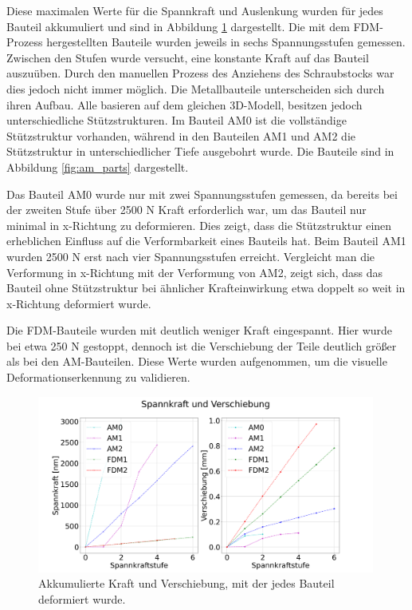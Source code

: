 Diese maximalen Werte für die Spannkraft und Auslenkung wurden für jedes Bauteil 
akkumuliert und sind in Abbildung \ref{fig:akkumulated} dargestellt. 
Die mit dem FDM-Prozess hergestellten Bauteile wurden jeweils in sechs Spannungsstufen
gemessen. Zwischen den Stufen wurde versucht, eine konstante Kraft auf das Bauteil 
auszuüben. Durch den manuellen Prozess des Anziehens des Schraubstocks war dies 
jedoch nicht immer möglich.
Die Metallbauteile unterscheiden sich durch ihren Aufbau. 
Alle basieren auf dem gleichen 3D-Modell, besitzen jedoch unterschiedliche 
Stützstrukturen. Im Bauteil AM0 ist die vollständige Stützstruktur vorhanden,
während in den Bauteilen AM1 und AM2 die Stützstruktur in unterschiedlicher 
Tiefe ausgebohrt wurde. Die Bauteile sind in Abbildung \ref{fig:am_parts} dargestellt.

Das Bauteil AM0 wurde nur mit zwei Spannungsstufen gemessen, 
da bereits bei der zweiten Stufe über 2500 N Kraft erforderlich war, 
um das Bauteil nur minimal in x-Richtung zu deformieren. Dies zeigt, 
dass die Stützstruktur einen erheblichen Einfluss auf die Verformbarkeit 
eines Bauteils hat. Beim Bauteil AM1 wurden 2500 N erst nach vier Spannungsstufen 
erreicht. Vergleicht man die Verformung in x-Richtung mit der Verformung von AM2,
 zeigt sich, dass das Bauteil ohne Stützstruktur bei ähnlicher Krafteinwirkung 
 etwa doppelt so weit in x-Richtung deformiert wurde.

 Die FDM-Bauteile wurden mit deutlich weniger Kraft eingespannt. 
 Hier wurde bei etwa 250 N gestoppt, dennoch ist die Verschiebung der 
 Teile deutlich größer als bei den AM-Bauteilen. Diese Werte wurden aufgenommen, 
 um die visuelle Deformationserkennung zu validieren.

\begin{figure}[H]
    \centering
    \includegraphics[width=0.99\textwidth]{images/spannkraftstufen_akkumuliert.png}
    \caption{Akkumulierte Kraft und Verschiebung, mit der jedes Bauteil deformiert wurde.}
    \label{fig:akkumulated}
\end{figure}

